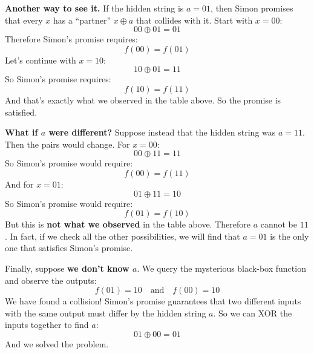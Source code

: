\highspace
\textcolor{Green3}{ \textbf{Another way to see it.}} If the hidden string is $a = 01$, then Simon promises that every $x$ has a ``partner'' $x \oplus a$ that collides with it. Start with $x = 00$:
\begin{equation*}
    00 \oplus 01 = 01
\end{equation*}
Therefore Simon's promise requires:
\begin{equation*}
    f(00) = f(01)
\end{equation*}
Let's continue with $x = 10$:
\begin{equation*}
    10 \oplus 01 = 11
\end{equation*}
So Simon's promise requires:
\begin{equation*}
    f(10) = f(11)
\end{equation*}
And that's exactly what we observed in the table above. So the promise is satisfied.

\highspace
\textcolor{Green3}{ \textbf{What if $a$ were different?}} Suppose instead that the hidden string was $a = 11$. Then the pairs would change. For $x = 00$:
\begin{equation*}
    00 \oplus 11 = 11
\end{equation*}
So Simon's promise would require:
\begin{equation*}
    f(00) = f(11)
\end{equation*}
And for $x = 01$:
\begin{equation*}
    01 \oplus 11 = 10
\end{equation*}
So Simon's promise would require:
\begin{equation*}
    f(01) = f(10)
\end{equation*}
But this is \textbf{not what we observed} in the table above. Therefore $a$ cannot be $11$. In fact, if we check all the other possibilities, we will find that $a = 01$ is the only one that satisfies Simon's promise.

\highspace
Finally, suppose \textbf{we don't know $a$}. We query the mysterious black-box function and observe the outputs:
\begin{equation*}
    f(01) = 10 \quad \text{and} \quad f(00) = 10
\end{equation*}
We have found a collision! Simon's promise guarantees that two different inputs with the same output must differ by the hidden string $a$. So we can XOR the inputs together to find $a$:
\begin{equation*}
    01 \oplus 00 = 01
\end{equation*}
And we solved the problem.

